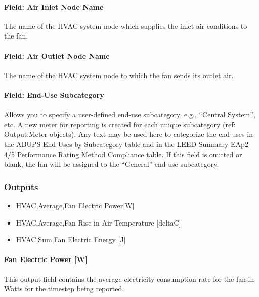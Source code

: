 \paragraph{Field: Air Inlet Node Name}\label{field-air-inlet-node-name-2-000}

The name of the HVAC system node which supplies the inlet air conditions to the fan.

\paragraph{Field: Air Outlet Node Name}\label{field-air-outlet-node-name-2-000}

The name of the HVAC system node to which the fan sends its outlet air.

\paragraph{Field: End-Use Subcategory}\label{field-end-use-subcategory-2-000}

Allows you to specify a user-defined end-use subcategory, e.g., ``Central System'', etc. A new meter for reporting is created for each unique subcategory (ref: Output:Meter objects). Any text may be used here to categorize the end-uses in the ABUPS End Uses by Subcategory table and in the LEED Summary EAp2-4/5 Performance Rating Method Compliance table. If this field is omitted or blank, the fan will be assigned to the ``General'' end-use subcategory.

\subsubsection{Outputs}\label{outputs-2-009}

\begin{itemize}
\item
  HVAC,Average,Fan Electric Power{[}W{]}
\item
  HVAC,Average,Fan Rise in Air Temperature {[}deltaC{]}
\item
  HVAC,Sum,Fan Electric Energy {[}J{]}
\end{itemize}

\paragraph{Fan Electric Power {[}W{]}}\label{fan-electric-power-w-2}

This output field contains the average electricity consumption rate for the fan in Watts for the timestep being reported.

